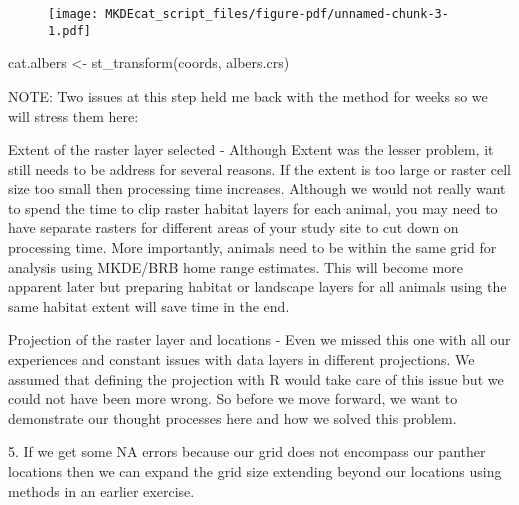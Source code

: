 \documentclass[
  letterpaper,
]{book}
\newenvironment{Shaded}{\begin{snugshade}}{\end{snugshade}}
\newcommand{\FunctionTok}[1]{\textcolor[rgb]{0.28,0.35,0.67}{#1}}
\newcommand{\NormalTok}[1]{\textcolor[rgb]{0.00,0.23,0.31}{#1}}
\newcommand{\OtherTok}[1]{\textcolor[rgb]{0.00,0.23,0.31}{#1}}
\begin{document}
\begin{figure}[H]

{\centering \texttt{[image: MKDEcat\_script\_files/figure-pdf/unnamed-chunk-3-1.pdf]}

}

\end{figure}

\begin{Shaded}
\begin{Highlighting}[]
\NormalTok{cat.albers }\OtherTok{\textless{}{-}} \FunctionTok{st\_transform}\NormalTok{(coords, albers.crs)}
\end{Highlighting}
\end{Shaded}

NOTE: Two issues at this step held me back with the method for weeks so
we will stress them here:

Extent of the raster layer selected - Although Extent was the lesser
problem, it still needs to be address for several reasons. If the extent
is too large or raster cell size too small then processing time
increases. Although we would not really want to spend the time to clip
raster habitat layers for each animal, you may need to have separate
rasters for different areas of your study site to cut down on processing
time. More importantly, animals need to be within the same grid for
analysis using MKDE/BRB home range estimates. This will become more
apparent later but preparing habitat or landscape layers for all animals
using the same habitat extent will save time in the end.

Projection of the raster layer and locations - Even we missed this one
with all our experiences and constant issues with data layers in
different projections. We assumed that defining the projection with R
would take care of this issue but we could not have been more wrong. So
before we move forward, we want to demonstrate our thought processes
here and how we solved this problem.

5. If we get some NA errors because our grid does not encompass our
panther locations then we can expand the grid size extending beyond our
locations using methods in an earlier exercise.
\end{document}
